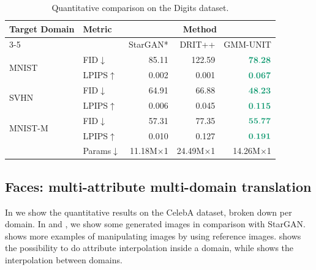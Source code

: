 \documentclass[runningheads]{llncs}
\newcommand{\bst}[1]{\textcolor[RGB]{27,158,119}{\mathbf{#1}}}
\begin{document}
\begin{table}[!ht]
    \small
	\centering
    \setlength{\tabcolsep}{4pt}
	\caption{Quantitative comparison on the  Digits dataset.}
	\begin{tabular}{@{}l lr rr@{}}
	\toprule
		\multirow{2}{*}{\textbf{Target Domain}} &
		\multirow{2}{*}{\textbf{Metric}} &
		\multicolumn{3}{c}{\textbf{Method}}  \\
		\cmidrule{3-5}
		& & StarGAN* & DRIT++&  GMM-UNIT \\
		\midrule
		\multirow{2}{*}{MNIST} & FID$\downarrow$ & 85.11 &  122.59 & $\bst{78.28}$ \\
		& LPIPS$\uparrow$ & 0.002 & 0.001  & $\bst{0.067}$ \\ \midrule
		\multirow{2}{*}{SVHN} & FID$\downarrow$ & 64.91 & 66.88 & $\bst{48.23}$   \\
		& LPIPS$\uparrow$ & 0.006 & 0.045 & $\bst{0.115}$ \\ \midrule
		\multirow{2}{*}{MNIST-M}
		& FID$\downarrow$ & 57.31 & 77.35 & $\bst{55.77}$ \\
		& LPIPS$\uparrow$ & 0.010 & 0.127 & $\bst{0.191}$ \\ \midrule
		& Params$\downarrow$ & 11.18M$\times$1 & 24.49M$\times$1 & 14.26M$\times$1 \\
		\bottomrule
	\end{tabular}
	\label{tab:appendix_QuantitativeResults_digits}
\end{table}

\subsection{Faces: multi-attribute multi-domain translation}
\label{sec:appendix_faces}
In  we show the quantitative results on the CelebA dataset, broken down per domain. In  and , we show some generated images in comparison with StarGAN.  shows more examples of manipulating images by using reference images.  shows the possibility to do attribute interpolation inside a domain, while  shows the interpolation between domains.
\end{document}

